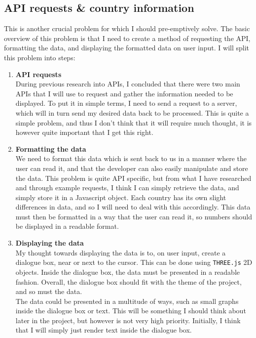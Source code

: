 \subsection{API requests \& country information}
This is another crucial problem for which I should pre-emptively solve. The basic overview of this problem is that I need to create a method of requesting the API, formatting the data, and displaying the formatted data on user input. I will split this problem into steps:
\begin{enumerate}
\item \textbf{API requests} \\
During previous research into APIs, I concluded that there were two main APIs that I will use to request and gather the information needed to be displayed. To put it in simple terms, I need to send a request to a server, which will in turn send my desired data back to be processed. This is quite a simple problem, and thus I don't think that it will require much thought, it is however quite important that I get this right.

\item \textbf{Formatting the data} \\
We need to format this data which is sent back to us in a manner where the user can read it, and that the developer can also easily manipulate and store the data. This problem is quite API specific, but from what I have researched and through example requests, I think I can simply retrieve the data, and simply store it in a Javascript object. Each country has its own slight differences in data, and so I will need to deal with this accordingly. This data must then be formatted in a way that the user can read it, so numbers should be displayed in a readable format.

\item \textbf{Displaying the data} \\
My thought towards displaying the data is to, on user input, create a dialogue box, near or next to the cursor. This can be done using \verb|THREE.js| 2D objects. Inside the dialogue box, the data must be presented in a readable fashion. Overall, the dialogue box should fit with the theme of the project, and so must the data. \\
The data could be presented in a multitude of ways, such as small graphs inside the dialogue box or text. This will be something I should think about later in the project, but however is not very high priority. Initially, I think that I will simply just render text inside the dialogue box.
\end{enumerate}

